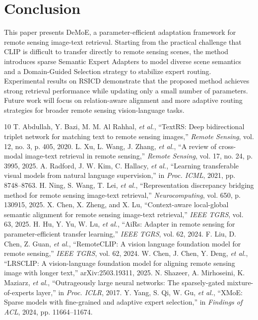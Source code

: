 \documentclass[conference]{IEEEtran}
\begin{document}
\section{Conclusion}
This paper presents DeMoE, a parameter-efficient adaptation framework for remote sensing image-text retrieval. Starting from the practical challenge that CLIP is difficult to transfer directly to remote sensing scenes, the method introduces sparse Semantic Expert Adapters to model diverse scene semantics and a Domain-Guided Selection strategy to stabilize expert routing. Experimental results on RSICD demonstrate that the proposed method achieves strong retrieval performance while updating only a small number of parameters. Future work will focus on relation-aware alignment and more adaptive routing strategies for broader remote sensing vision-language tasks.

\balance
\begin{thebibliography}{10}
 T. Abdullah, Y. Bazi, M. M. Al Rahhal, \emph{et al.}, ``TextRS: Deep bidirectional triplet network for matching text to remote sensing images,'' \emph{Remote Sensing}, vol. 12, no. 3, p. 405, 2020.
 L. Xu, L. Wang, J. Zhang, \emph{et al.}, ``A review of cross-modal image-text retrieval in remote sensing,'' \emph{Remote Sensing}, vol. 17, no. 24, p. 3995, 2025.
 A. Radford, J. W. Kim, C. Hallacy, \emph{et al.}, ``Learning transferable visual models from natural language supervision,'' in \emph{Proc. ICML}, 2021, pp. 8748--8763.
 H. Ning, S. Wang, T. Lei, \emph{et al.}, ``Representation discrepancy bridging method for remote sensing image-text retrieval,'' \emph{Neurocomputing}, vol. 650, p. 130915, 2025.
 X. Chen, X. Zheng, and X. Lu, ``Context-aware local-global semantic alignment for remote sensing image-text retrieval,'' \emph{IEEE TGRS}, vol. 63, 2025.
 H. Hu, Y. Yu, W. Lu, \emph{et al.}, ``AiRs: Adapter in remote sensing for parameter-efficient transfer learning,'' \emph{IEEE TGRS}, vol. 62, 2024.
 F. Liu, D. Chen, Z. Guan, \emph{et al.}, ``RemoteCLIP: A vision language foundation model for remote sensing,'' \emph{IEEE TGRS}, vol. 62, 2024.
 W. Chen, J. Chen, Y. Deng, \emph{et al.}, ``LRSCLIP: A vision-language foundation model for aligning remote sensing image with longer text,'' arXiv:2503.19311, 2025.
 N. Shazeer, A. Mirhoseini, K. Maziarz, \emph{et al.}, ``Outrageously large neural networks: The sparsely-gated mixture-of-experts layer,'' in \emph{Proc. ICLR}, 2017.
 Y. Yang, S. Qi, W. Gu, \emph{et al.}, ``XMoE: Sparse models with fine-grained and adaptive expert selection,'' in \emph{Findings of ACL}, 2024, pp. 11664--11674.
\end{thebibliography}
\end{document}
